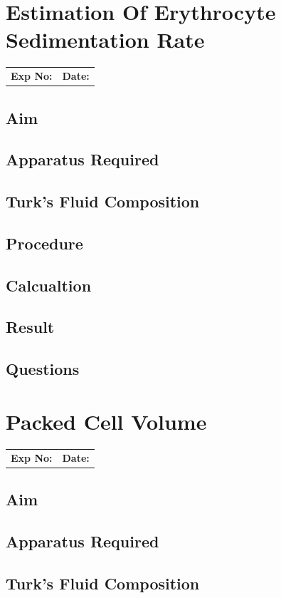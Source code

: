 \documentclass[a4paper,12pt]{book}
\begin{document}
\chapter*{\centering Estimation Of Erythrocyte Sedimentation Rate}
		\begin{tabular}{p{5in} p{1in}}
			\textbf{Exp No:}  & \textbf{Date:}\\
		\end{tabular}
	\section*{Aim}
	\section*{Apparatus Required}
	\section*{Turk's Fluid Composition}
	\section*{Procedure}
	\section*{Calcualtion}
	\section*{Result}
	\section*{Questions}


\chapter*{\centering Packed Cell Volume}
		\begin{tabular}{p{5in} p{1in}}
			\textbf{Exp No:}  & \textbf{Date:}\\
		\end{tabular}
	\section*{Aim}
	\section*{Apparatus Required}
	\section*{Turk's Fluid Composition}
\end{document}
